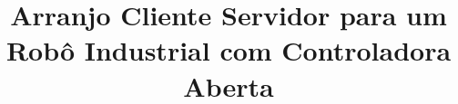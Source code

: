 \documentclass{estrutura}
\title{Arranjo Cliente Servidor para um Robô Industrial com Controladora Aberta}
\begin{document}
    \maketitle{}
    
    \toc{}
    
    
    
    
    
    \printbibliography{}
\end{document}

